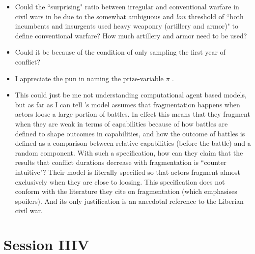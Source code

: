 \documentclass[12pt]{article}
\begin{document}
\begin{itemize}

	\item Could the ``surprising" ratio between irregular and conventional
		warfare in civil wars in \citet{KALYVAS_2010} be due to the
		somewhat ambiguous and \textit{low} threshold of ``both
		incumbents and insurgents used heavy weaponry (artillery and
		armor)" to define conventional warfare? How much artillery and
		armor need to be used? 

	\item Could it be because of the condition of only sampling the first
		year of conflict?

	\item I appreciate the pun in naming the prize-variable $\pi$
		\citep{Findley_2012}.

	\item This could just be me not understanding computational agent based
		models, but as far as I can tell \citet{Findley_2012}'s model
		assumes that fragmentation happens when actors loose a large
		portion of battles. In effect this means that they fragment when
		they are weak in terms of capabilities because of how battles
		are defined to shape outcomes in capabilities, and how the
		outcome of battles is defined as a comparison between relative
		capabilities (before the battle) and a random component. With
		such a specification, how can they claim that the results that
		conflict durations decrease with fragmentation is ``counter
		intuitive"? Their model is literally specified so that actors
		fragment almost exclusively when they are close to loosing. This
		specification does not conform with the literature they cite on
		fragmentation (which emphasises spoilers). And its only
		justification is an anecdotal reference to the Liberian civil
		war. 

\end{itemize}

\section*{Session IIIV}
\end{document}
